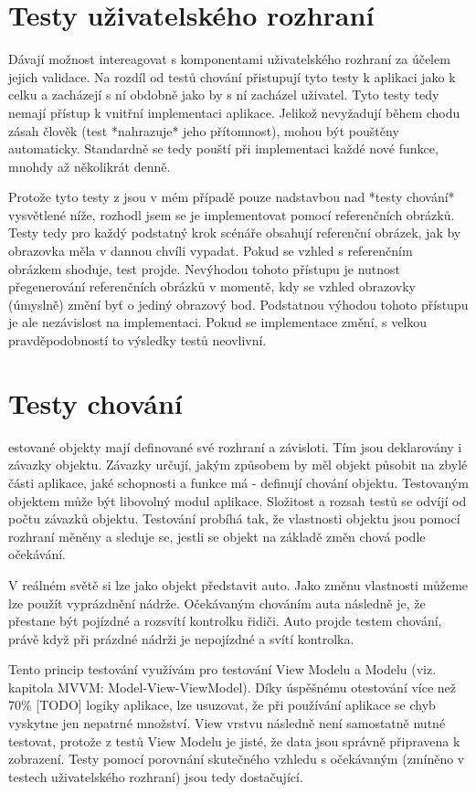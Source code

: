 \section{Testy uživatelského rozhraní}

Dávají možnost intereagovat s komponentami uživatelského rozhraní za účelem jejich validace.
Na rozdíl od testů chování přistupují tyto testy k aplikaci jako k celku a zacházejí s ní obdobně jako by s ní zacházel uživatel. Tyto testy tedy nemají přístup k vnitřní implementaci aplikace.
Jelikož nevyžadují během chodu zásah člověk (test *nahrazuje* jeho přítomnost), mohou být pouštěny automaticky.
Standardně se tedy pouští při implementaci každé nové funkce, mnohdy až několikrát denně. \cite{apple-ui-testing}

Protože tyto testy z jsou v mém případě pouze nadstavbou nad *testy chování* vysvětlené níže, rozhodl jsem se je implementovat pomocí referenčních obrázků.
Testy tedy pro každý podstatný krok scénáře obsahují referenční obrázek, jak by obrazovka měla v dannou chvíli vypadat.
Pokud se vzhled s referenčním obrázkem shoduje, test projde.
Nevýhodou tohoto přístupu je nutnost přegenerování referenčních obrázků v momentě,
kdy se vzhled obrazovky (úmyslně) změní byť o jediný obrazový bod.
Podstatnou výhodou tohoto přístupu je ale nezávislost na implementaci.
Pokud se implementace změní, s velkou pravděpodobností to výsledky testů neovlivní.

\section{Testy chování}

estované objekty mají definované své rozhraní a závisloti.
Tím jsou deklarovány i závazky objektu.
Závazky určují, jakým způsobem by měl objekt působit na zbylé části aplikace, jaké schopnosti a funkce má - definují chování objektu.
Testovaným objektem může být libovolný modul aplikace.
Složitost a rozsah testů se odvíjí od počtu závazků objektu.
Testování probíhá tak, že vlastnosti objektu jsou pomocí rozhraní měněny a sleduje se, jestli se objekt na základě změn chová podle očekávání. \cite{objcio-bdd}


V reálném světě si lze jako objekt představit auto.
Jako změnu vlastnosti můžeme lze použít vyprázdnění nádrže.
Očekávaným chováním auta následně je, že přestane být pojízdné a rozsvítí kontrolku řidiči.
Auto projde testem chování, právě když při prázdné nádrži je nepojízdné a svítí kontrolka.


Tento princip testování využívám pro testování View Modelu a Modelu (viz. kapitola MVVM: Model-View-ViewModel).
Díky úspěšnému otestování více než 70\% [TODO] logiky aplikace, lze usuzovat, že při používání aplikace se chyb vyskytne jen nepatrné množství.
View vrstvu následně není samostatně nutné testovat, protože z testů View Modelu je jisté, že data jsou správně připravena k zobrazení.
Testy pomocí porovnání skutečného vzhledu s očekávaným (zmíněno v testech uživatelského rozhraní) jsou tedy dostačující.



